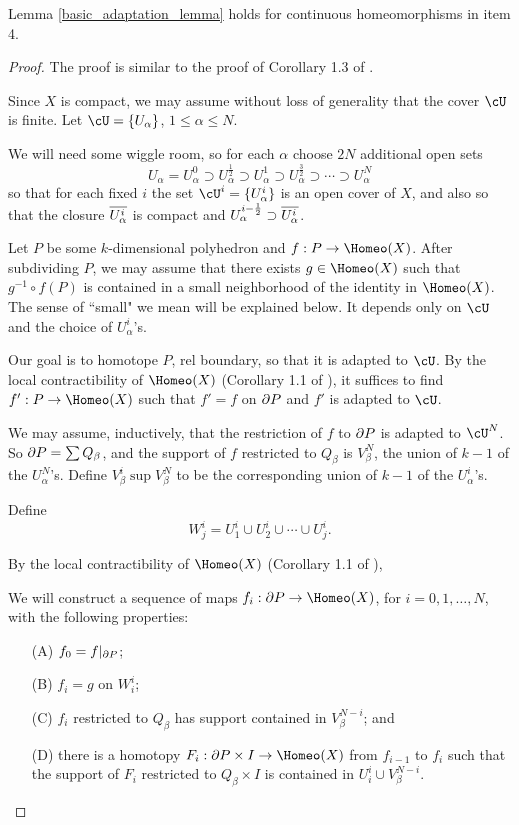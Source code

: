 \begin{lemma} \label{basic_adaptation_lemma_2}
Lemma \ref{basic_adaptation_lemma} holds for continuous homeomorphisms
in item 4.
\end{lemma}

\begin{proof}
The proof is similar to the proof of Corollary 1.3 of \cite{MR0283802}.

Since $X$ is compact, we may assume without loss of generality that the cover $\cU$ is finite.
Let $\cU = \{U_\alpha\}$, $1\le \alpha\le N$.

We will need some wiggle room, so for each $\alpha$ choose $2N$ additional open sets
\[
	U_\alpha = U_\alpha^0 \supset U_\alpha^\frac12 \supset U_\alpha^1 \supset U_\alpha^\frac32 \supset \cdots \supset U_\alpha^N
\]
so that for each fixed $i$ the set $\cU^i = \{U_\alpha^i\}$ is an open cover of $X$, and also so that
the closure $\overline{U_\alpha^i}$ is compact and $U_\alpha^{i-\frac12} \supset \overline{U_\alpha^i}$.

Let $P$ be some $k$-dimensional polyhedron and $f:P\to \Homeo(X)$.
After subdividing $P$, we may assume that there exists $g\in \Homeo(X)$
such that $g^{-1}\circ f(P)$ is contained in a small neighborhood of the 
identity in $\Homeo(X)$.
The sense of ``small" we mean will be explained below.
It depends only on $\cU$ and the choice of $U_\alpha^i$'s.

Our goal is to homotope $P$, rel boundary, so that it is adapted to $\cU$.
By the local contractibility of $\Homeo(X)$ (Corollary 1.1 of \cite{MR0283802}), 
it suffices to find $f':P\to \Homeo(X)$ such that $f' = f$ on $\partial P$ and $f'$ is adapted to $\cU$.

We may assume, inductively, that the restriction of $f$ to $\partial P$ is adapted to $\cU^N$.
So $\partial P = \sum Q_\beta$, and the support of $f$ restricted to $Q_\beta$ is $V_\beta^N$, the union of $k-1$ of
the $U_\alpha^N$'s.  Define $V_\beta^i \sup V_\beta^N$ to be the corresponding union of $k-1$
of the $U_\alpha^i$'s.

Define
\[
	W_j^i = U_1^i \cup U_2^i \cup \cdots \cup U_j^i .
\]

By the local contractibility of $\Homeo(X)$ (Corollary 1.1 of \cite{MR0283802}), 

We will construct a sequence of maps $f_i : \bd P\to \Homeo(X)$, for $i = 0, 1, \ldots, N$, with the following properties:
\begin{itemize}
\item[(A)] $f_0 = f|_{\partial P}$;
\item[(B)] $f_i = g$ on $W_i^i$;
\item[(C)] $f_i$ restricted to $Q_\beta$ has support contained in $V_\beta^{N-i}$; and
\item[(D)] there is a homotopy $F_i : \bd P\times I \to \Homeo(X)$ from $f_{i-1}$ to $f_i$ such that the 
support of $F_i$ restricted to $Q_\beta\times I$ is contained in $U_i^i\cup V_\beta^{N-i}$.
\end{itemize}


\end{proof}
